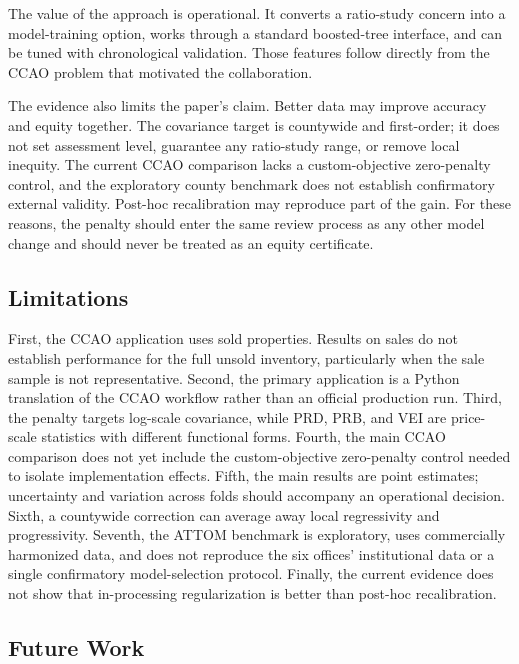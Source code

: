 \documentclass[10pt]{article}
\theoremstyle{definition}
\newcommand{\1}{\mathbf{1}}
\newcommand{\advisorchange}[1]{{\color{blue}#1}}
\begin{document}
{{The value of the approach is operational. It converts a ratio-study concern into a model-training option, works through a standard boosted-tree interface, and can be tuned with chronological validation. \advisorchange{Those features follow directly from the CCAO problem that motivated the collaboration.}

The evidence also limits the paper's claim. Better data may improve accuracy and equity together. The covariance target is countywide and first-order; it does not set assessment level, guarantee any ratio-study range, or remove local inequity. The current CCAO comparison lacks a custom-objective zero-penalty control, and the exploratory county benchmark does not establish confirmatory external validity. Post-hoc recalibration may reproduce part of the gain. For these reasons, the penalty should enter the same review process as any other model change and should never be treated as an equity certificate.

\subsection{Limitations}

\advisorchange{First, the CCAO application uses sold properties.} Results on sales do not establish performance for the full unsold inventory, particularly when the sale sample is not representative. \advisorchange{Second, the primary application is a Python translation} of the CCAO workflow rather than an official production run. Third, the penalty targets log-scale covariance, while PRD, PRB, and VEI are price-scale statistics with different functional forms. Fourth, the main CCAO comparison does not yet include the custom-objective zero-penalty control needed to isolate implementation effects. Fifth, the main results are point estimates; uncertainty and variation across folds should accompany an operational decision. Sixth, a countywide correction can average away local regressivity and progressivity. Seventh, the ATTOM benchmark is exploratory, uses commercially harmonized data, and does not reproduce the six offices' institutional data or a single confirmatory model-selection protocol. Finally, the current evidence does not show that in-processing regularization is better than post-hoc recalibration.

\subsection{Future Work}

}}
\end{document}
